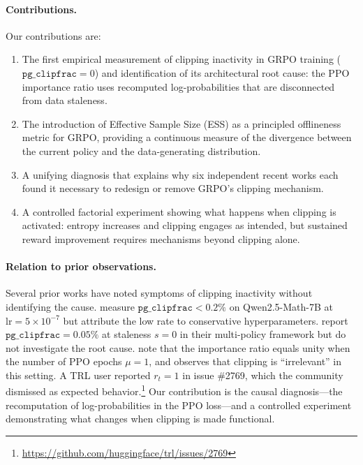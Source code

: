 \paragraph{Contributions.}
Our contributions are:
\begin{enumerate}
    \item The first empirical measurement of clipping inactivity in GRPO training ($\texttt{pg\_clipfrac} = 0$) and identification of its architectural root cause: the PPO importance ratio uses recomputed log-probabilities that are disconnected from data staleness.

    \item The introduction of Effective Sample Size (ESS) as a principled offlineness metric for GRPO, providing a continuous measure of the divergence between the current policy and the data-generating distribution.

    \item A unifying diagnosis that explains why six independent recent works \citep{dapo2025,gspo2025,cfpo2025,aspo2025,rgra2025,chen2025iclr} each found it necessary to redesign or remove GRPO's clipping mechanism.

    \item A controlled factorial experiment showing what happens when clipping is activated: entropy increases and clipping engages as intended, but sustained reward improvement requires mechanisms beyond clipping alone.
\end{enumerate}

\paragraph{Relation to prior observations.}
Several prior works have noted symptoms of clipping inactivity without identifying the cause.
\citet{chen2025iclr} measure $\texttt{pg\_clipfrac} < 0.2\%$ on Qwen2.5-Math-7B at $\text{lr} = 5 \times 10^{-7}$ but attribute the low rate to conservative hyperparameters.
\citet{prosperity2025} report $\texttt{pg\_clipfrac} = 0.05\%$ at staleness $s = 0$ in their multi-policy framework but do not investigate the root cause.
\citet{grpo_secretly_prm} note that the importance ratio equals unity when the number of PPO epochs $\mu = 1$, and \citet{lambert2025} observes that clipping is ``irrelevant'' in this setting.
A TRL user reported $r_t = 1$ in issue \#2769, which the community dismissed as expected behavior.\footnote{\url{https://github.com/huggingface/trl/issues/2769}}
Our contribution is the causal diagnosis---the recomputation of log-probabilities in the PPO loss---and a controlled experiment demonstrating what changes when clipping is made functional.


